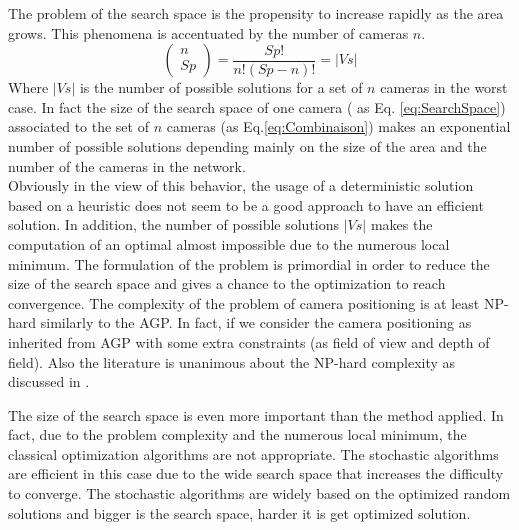The problem of the search space is the propensity to increase rapidly as the area grows. This phenomena is accentuated by the number of cameras $n$.
 \begin{equation} \label{eq:Combinaison}
 \begin{pmatrix} n \\ Sp \end{pmatrix}  = \frac{Sp!}{n!(Sp-n)!} = |Vs|
 \end{equation} 
 Where $|Vs|$ is the number of possible solutions for a set of $n$ cameras in the worst case. %
 In fact the size of the search space of one camera ( as Eq. \ref{eq:SearchSpace}) associated to the set of $n$ cameras (as Eq.\ref{eq:Combinaison}) makes an exponential number of possible solutions depending mainly on the size of the area and the number of the cameras in the network. \\
 Obviously in the view of this behavior, the usage of a deterministic solution based on a heuristic does not seem to be a good approach to have an efficient solution. In addition, the number of possible solutions $|Vs|$ makes the computation of an optimal almost impossible due to the numerous local minimum. 
 The formulation of the problem is primordial in order to reduce the size of the search space and gives a chance to the optimization to reach convergence.
 The complexity of the problem of camera positioning is  at least  NP-hard  similarly to  the AGP. In fact, if we consider the  camera positioning  as inherited from AGP  with some extra constraints (as field of view and depth of field). Also the literature is unanimous about the  NP-hard complexity as discussed in  \citep{43*erdem2006,53*packer2008,62*vijayan1991,22*zhao2008,49*ning1994}. %

The size of the search space is even more important than the method applied. In fact, due to the  problem complexity   and  the numerous local minimum, the classical optimization algorithms  are not  appropriate. The stochastic algorithms  are efficient in this case due to the wide  search space that increases the difficulty to converge. The stochastic algorithms are  widely based on the optimized random solutions and bigger is the  search space,  harder it is get optimized solution. 


